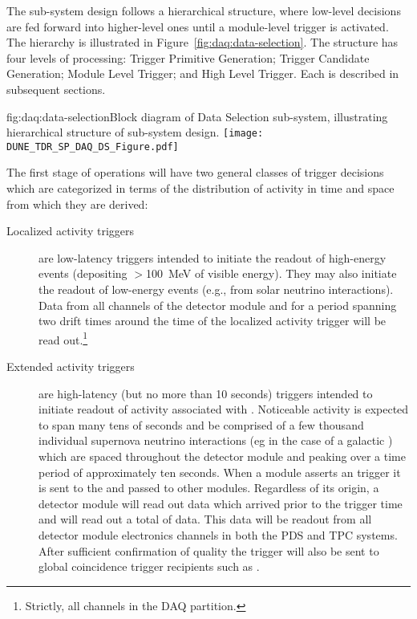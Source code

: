 The  sub-system design follows a hierarchical structure, where low-level
decisions are fed forward into higher-level ones until a  module-level trigger is activated. The hierarchy
is illustrated in Figure~\ref{fig:daq:data-selection}. The structure
has four levels of processing: Trigger Primitive Generation;
Trigger Candidate Generation; Module Level Trigger; and High Level
Trigger. Each is described in subsequent sections.

\begin{dunefigure}{fig:daq:data-selection}{Block diagram of  
    Data Selection sub-system, illustrating hierarchical structure of
    sub-system design.}
  \texttt{[image: DUNE\_TDR\_SP\_DAQ\_DS\_Figure.pdf]}
\end{dunefigure}

The first stage of operations will have two general classes of trigger
decisions which are categorized in terms of the distribution of activity
in time and space from which they are derived:
\begin{description}
\item[Localized activity triggers] are low-latency triggers intended to
  initiate the readout of high-energy events (depositing $>$100~MeV of
  visible energy). 
  They may also initiate the readout of low-energy events (e.g., from
  solar neutrino interactions).
  Data from all channels of the detector module and for a period
  spanning two drift times around the time of the localized activity
  trigger will be read out.\footnote{Strictly, all channels in the DAQ partition.}
\item[Extended activity triggers] are high-latency
  (but no more than 10 seconds) triggers intended to initiate readout of
  activity associated with . 
  Noticeable  activity is expected to span many tens of
  seconds and be comprised of a few thousand individual supernova
  neutrino interactions (eg in the case of a galactic ) which
  are spaced throughout the detector module and peaking over a time
  period of approximately ten seconds.
  When a module asserts an  trigger it is sent to the
   and passed to other modules. 
  Regardless of its origin, a detector module will read out data which
  arrived \snbpretime prior to the trigger time and will read out a
  total of \snbtime data. 
  This data will be readout from all detector module electronics
  channels in both the PDS and TPC systems. 
  After sufficient confirmation of quality the  trigger will
  also be sent to global coincidence trigger recipients such as
  .
\end{description}

